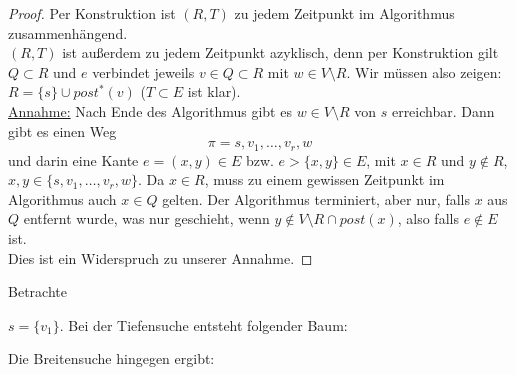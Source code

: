 \begin{proof}
Per Konstruktion ist $(R,T)$ zu jedem Zeitpunkt im Algorithmus zusammenhängend.\\
$(R,T)$ ist außerdem zu jedem Zeitpunkt azyklisch, denn per Konstruktion gilt $Q \subset R$ und $e$ verbindet jeweils $v \in  Q \subset R$ mit $w \in  V \setminus R$. Wir müssen also zeigen: $R = \{s\} \cup post^{*}(v)$ ($T \subset E$ ist klar). \\
\underline{Annahme:} Nach Ende des Algorithmus gibt es $w \in  V \setminus R$ von $s$ erreichbar. Dann gibt es einen Weg \[
\pi = s,v_1,\ldots,v_r, w
\]
und darin eine Kante $e=(x,y) \in E$ bzw. $e >\{x,y\} \in E$, mit $x \in R$ und $y \not\in R$, $x,y \in \{s,v_1,\ldots,v_r,w\} $.
Da $x \in  R$, muss zu einem gewissen Zeitpunkt im Algorithmus auch $x \in  Q$ gelten. Der Algorithmus terminiert, aber nur, falls $x$ aus $Q$ entfernt wurde, was nur geschieht, wenn $y \not\in V \setminus R \cap post(x)$, also falls $e \not\in E$ ist. \\
Dies ist ein Widerspruch zu unserer Annahme.
\end{proof}
\begin{example}
Betrachte 
\begin{center}
\end{center}
$s =\{v_1\}$. Bei der Tiefensuche entsteht folgender Baum:
\begin{center}
\end{center}
Die Breitensuche hingegen ergibt:
\begin{center}
\end{center}
\end{example}
